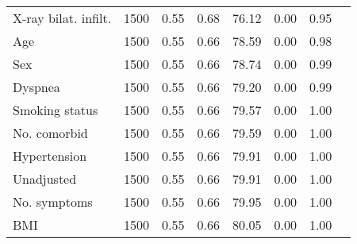 \documentclass{article}
\begin{document}
{\begin{longtable}{lccccccc}
X-ray bilat. infilt. & 1500 & 0.55 & 0.68 & 76.12 &  0.00 & 0.95 \\ 
Age & 1500 & 0.55 & 0.66 & 78.59 &  0.00 & 0.98 \\ 
Sex & 1500 & 0.55 & 0.66 & 78.74 &  0.00 & 0.99 \\ 
Dyspnea & 1500 & 0.55 & 0.66 & 79.20 &  0.00 & 0.99 \\ 
Smoking status & 1500 & 0.55 & 0.66 & 79.57 &  0.00 & 1.00 \\ 
No. comorbid & 1500 & 0.55 & 0.66 & 79.59 &  0.00 & 1.00 \\ 
Hypertension & 1500 & 0.55 & 0.66 & 79.91 &  0.00 & 1.00 \\ 
Unadjusted & 1500 & 0.55 & 0.66 & 79.91 &  0.00 & 1.00 \\ 
No. symptoms & 1500 & 0.55 & 0.66 & 79.95 &  0.00 & 1.00 \\ 
BMI & 1500 & 0.55 & 0.66 & 80.05 &  0.00 & 1.00 \\
\bottomrule
\hline
\end{longtable}
}

\clearpage
\end{document}
